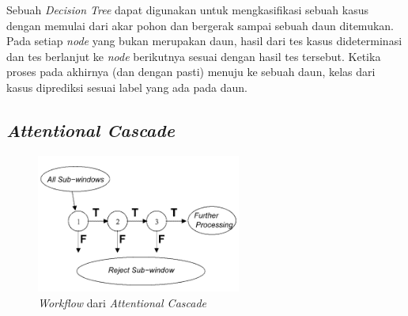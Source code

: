 Sebuah \emph{Decision Tree} dapat digunakan untuk mengkasifikasi sebuah kasus 
dengan memulai dari akar pohon dan bergerak sampai sebuah daun ditemukan. 
Pada setiap \emph{node} yang bukan merupakan daun, hasil dari tes kasus 
dideterminasi dan tes berlanjut ke \emph{node} berikutnya sesuai dengan 
hasil tes tersebut. Ketika proses pada akhirnya (dan dengan pasti) 
menuju ke sebuah daun, kelas dari kasus diprediksi sesuai label yang ada pada daun.



\subsection{\emph{Attentional Cascade}}

\begin{figure}[H]
  \centering{}
	\includegraphics[width=0.6\textwidth]{gambar/cascade}
  \caption{\textit{Workflow} dari \emph{Attentional Cascade}}
\end{figure}

